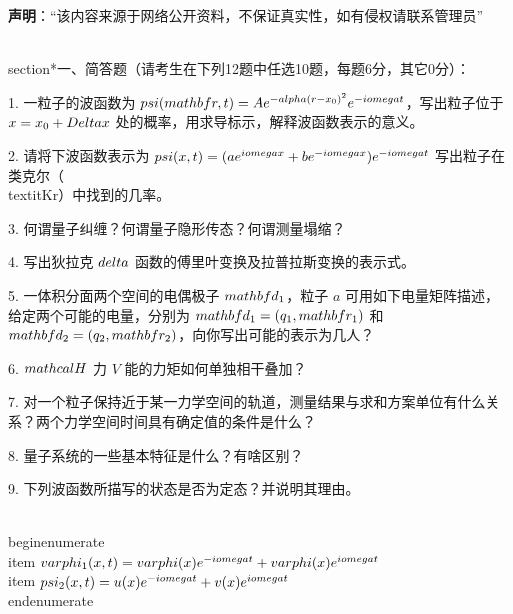 
\textbf{声明}：“该内容来源于网络公开资料，不保证真实性，如有侵权请联系管理员”

\\section*{一、简答题（请考生在下列12题中任选10题，每题6分，其它0分）：}

1. 一粒子的波函数为 $\\psi (\\mathbf{r}, t) = A e^{-\\alpha(r - x_0)^2} e^{-i \\omega t}$，写出粒子位于 $x = x_0 + \\Delta x$ 处的概率，用求导标示，解释波函数表示的意义。

2. 请将下波函数表示为 $\\psi (x, t) = (a e^{i \\omega x} + b e^{-i \\omega x}) e^{-i \\omega t}$ 写出粒子在类克尔（\\textit{Kr}）中找到的几率。

3. 何谓量子纠缠？何谓量子隐形传态？何谓测量塌缩？

4. 写出狄拉克 $\\delta$ 函数的傅里叶变换及拉普拉斯变换的表示式。

5. 一体积分面两个空间的电偶极子 $ \\mathbf{d}_1$，粒子 $a$ 可用如下电量矩阵描述，给定两个可能的电量，分别为 $\\mathbf{d}_1 = (q_1, \\mathbf{r}_1)$ 和 $\\mathbf{d}_2 = (q_2, \\mathbf{r}_2)$，向你写出可能的表示为几人？

6. $\\mathcal{H}$ 力 $V$ 能的力矩如何单独相干叠加？

7. 对一个粒子保持近于某一力学空间的轨道，测量结果与求和方案单位有什么关系？两个力学空间时间具有确定值的条件是什么？

8. 量子系统的一些基本特征是什么？有啥区别？

9. 下列波函数所描写的状态是否为定态？并说明其理由。

\\begin{enumerate}
  \\item $\\varphi_1 (x, t) = \\varphi (x) e^{-i \\omega t} + \\varphi (x) e^{i \\omega t}$
  \\item $\\psi_2 (x, t) = u (x) e^{-i \\omega t} + v (x) e^{i \\omega t}$
\\end{enumerate}

